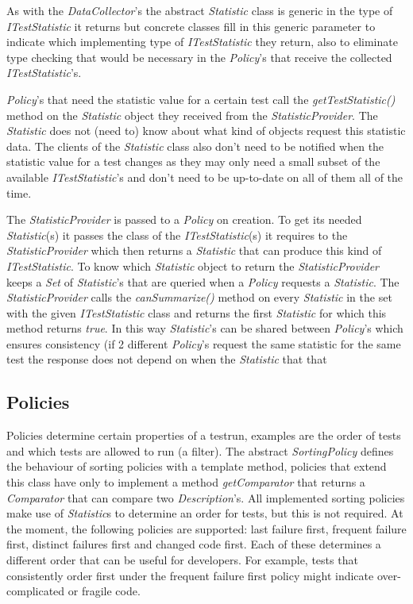\documentclass[i2]{oss}
\newcommand{\class}[1]{\emph{#1}}
\newcommand{\method}[1]{\emph{#1}}
\begin{document}
As with the \class{DataCollector}'s the abstract \class{Statistic} class
is generic in the type of \class{ITestStatistic} it returns but concrete
classes fill in this generic parameter to indicate which implementing
type of \class{ITestStatistic} they return, also to eliminate type 
checking that would be necessary in the \class{Policy}'s that receive
the collected \class{ITestStatistic}'s.

\class{Policy}'s that need the statistic value for a certain test call
the \method{getTestStatistic()} method on the \class{Statistic} object
they received from the \class{StatisticProvider}.
The \class{Statistic} does not (need to) know about what kind of objects
request this statistic data.
The clients of the \class{Statistic} class also don't need to be 
notified when the statistic value for a test changes as they may only
need a small subset of the available \class{ITestStatistic}'s and don't
need to be up-to-date on all of them all of the time.

The \class{StatisticProvider} is passed to a \class{Policy} on creation.
To get its needed \class{Statistic}(s) it passes the class of the 
\class{ITestStatistic}(s) it requires to the \class{StatisticProvider}
which then returns a \class{Statistic} that can produce this kind of
\class{ITestStatistic}.
To know which \class{Statistic} object to return the 
\class{StatisticProvider} keeps a \class{Set} of \class{Statistic}'s 
that are queried when a \class{Policy} requests a \class{Statistic}.
The \class{StatisticProvider} calls the \method{canSummarize()} method
on every \class{Statistic} in the set with the given 
\class{ITestStatistic} class and returns the first \class{Statistic}
for which this method returns \emph{true}.
In this way \class{Statistic}'s can be shared between \class{Policy}'s
which ensures consistency (if 2 different \class{Policy}'s request the
same statistic for the same test the response does not depend on when
the \class{Statistic} that that 



\subsection{Policies}
\label{subssec: Policies}

Policies determine certain properties of a testrun, examples are
the order of tests and which tests are allowed to run (a filter).
The abstract \class{SortingPolicy} defines the behaviour of sorting
policies with a template method, policies that extend this class have
only to implement a method \method{getComparator} that returns a 
\class{Comparator} that can compare two \class{Description}'s.
All implemented sorting policies make use of \class{Statistic}s to 
determine an order for tests, but this is not required.
At the moment, the following policies are supported: last failure first, 
frequent failure first, distinct failures first and changed code  first.
Each of these determines a different order that can be useful for
developers.
For example, tests that consistently order first under the frequent
failure first policy might indicate over-complicated or fragile code.
\end{document}
